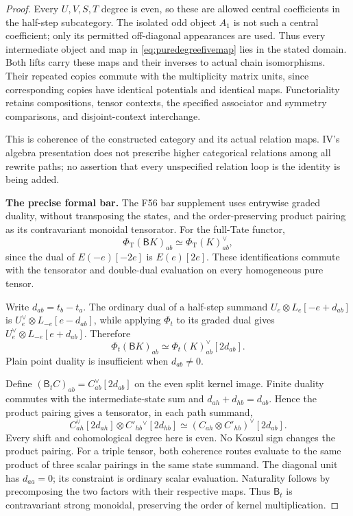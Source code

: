 \documentclass[11pt,a4paper]{article}
\theoremstyle{named}\newtheorem{finding}{Finding}[section]
\theoremstyle{definition}\newtheorem{definition}[finding]{Definition}
\theoremstyle{remark}\newtheorem{remark}[finding]{Remark}
\begin{document}
\begin{proof}
Every \(U,V,S,T\) degree is even, so these are allowed
central coefficients in the half-step subcategory.
The isolated odd object \(A_1\) is not such a central
coefficient; only its permitted off-diagonal appearances
are used. Thus every intermediate object and map in
\eqref{eq:puredegreefivemap} lies in the stated domain.
Both lifts carry these maps and their inverses to actual
chain isomorphisms. Their repeated copies commute with
the multiplicity matrix units, since corresponding
copies have identical potentials and identical maps.
Functoriality retains compositions, tensor contexts,
the specified associator and symmetry comparisons,
and disjoint-context interchange.

This is coherence of the constructed category and its
actual relation maps. IV's algebra presentation does
not prescribe higher categorical relations among all
rewrite paths; no assertion that every unspecified
relation loop is the identity is being added.

\par\smallskip\noindent\textbf{The precise formal bar.}\quad
The F56 bar supplement uses entrywise graded duality,
without transposing the states, and the order-preserving
product pairing as its contravariant monoidal tensorator.
For the full-Tate functor,
\[
 \Phi_{\mathrm T}(\mathsf B K)_{ab}
     \simeq\Phi_{\mathrm T}(K)_{ab}^{\vee},
\]
since the dual of \(E(-e)[-2e]\) is \(E(e)[2e]\).
These identifications commute with the tensorator and
double-dual evaluation on every homogeneous pure tensor.

Write \(d_{ab}=t_b-t_a\). The ordinary dual of a half-step
summand \(U_e\otimes L_e[-e+d_{ab}]\) is
\(U_e^\vee\otimes L_{-e}[e-d_{ab}]\), while applying
\(\Phi_t\) to its graded dual gives
\(U_e^\vee\otimes L_{-e}[e+d_{ab}]\). Therefore
\begin{equation}\label{eq:purekernelbarcorrection}
 \Phi_t(\mathsf B K)_{ab}
      \simeq\Phi_t(K)_{ab}^{\vee}[2d_{ab}].
\end{equation}
Plain point duality is insufficient when \(d_{ab}\ne0\).

Define \((\mathsf B_t C)_{ab}=C_{ab}^\vee[2d_{ab}]\)
on the even split kernel image. Finite duality commutes
with the intermediate-state sum and
\(d_{ah}+d_{hb}=d_{ab}\). Hence the product pairing gives
a tensorator, in each path summand,
\[
 C_{ah}^\vee[2d_{ah}]
       \otimes C'_{hb}{}^\vee[2d_{hb}]
   \simeq (C_{ah}\otimes C'_{hb})^\vee[2d_{ab}].
\]
Every shift and cohomological degree here is even.
No Koszul sign changes the product pairing.
For a triple tensor, both coherence routes evaluate
to the same product of three scalar pairings in the
same state summand. The diagonal unit has \(d_{aa}=0\);
its constraint is ordinary scalar evaluation.
Naturality follows by precomposing the two factors
with their respective maps. Thus \(\mathsf B_t\)
is contravariant strong monoidal, preserving the
order of kernel multiplication.


\end{proof}
\end{document}
